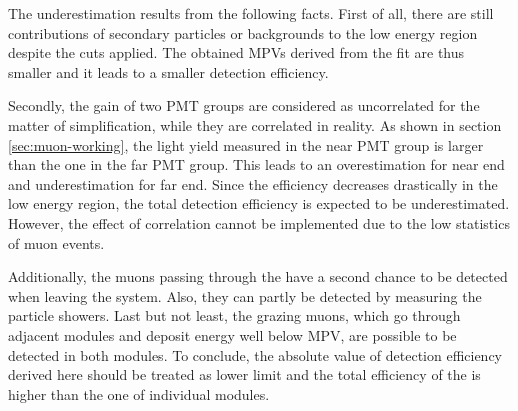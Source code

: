 The underestimation results from the following facts. First of all, there are still contributions of secondary particles or backgrounds to the low energy region despite the cuts applied. The obtained MPVs derived from the fit are thus smaller and it leads to a smaller detection efficiency.

Secondly, the gain of two PMT groups are considered as uncorrelated for the matter of simplification, while they are correlated in reality. As shown in section \ref{sec:muon-working}, the light yield measured in the near PMT group is larger than the one in the far PMT group. This leads to an overestimation for near end and underestimation for far end. Since the efficiency decreases drastically in the low energy region, the total detection efficiency is expected to be underestimated. However, the effect of correlation cannot be implemented due to the low statistics of muon events.


Additionally, the muons passing through the \mvs{} have a second chance to be detected when leaving the system. Also, they can partly be detected by measuring the particle showers. Last but not least, the grazing muons, which go through adjacent modules and deposit energy well below MPV, are possible to be detected in both modules. To conclude, the absolute value of detection efficiency derived here should be treated as lower limit and the total efficiency of the \mvs{} is higher than the one of individual modules.


